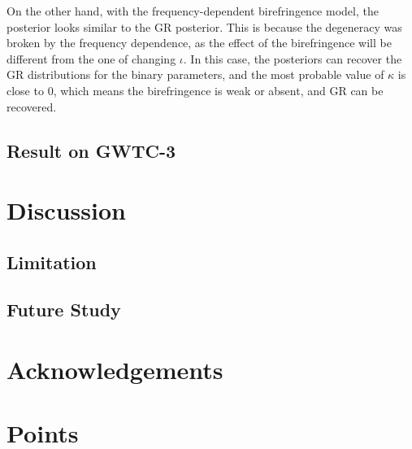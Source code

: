 \documentclass[twocolumn]{aastex631}
\begin{document}
On the other hand, with the frequency-dependent birefringence model, the posterior looks similar to the GR posterior.
This is because the degeneracy was broken by the frequency dependence, as the effect of the birefringence will be different from the one of changing $\iota$.
In this case, the posteriors can recover the GR distributions for the binary parameters,
and the most probable value of $\kappa$ is close to $0$, which means the birefringence is weak or absent, and GR can be recovered.

\subsection{Result on GWTC-3}

\section{Discussion}

\subsection{Limitation}



\subsection{Future Study}



\section{Acknowledgements}





\section{Points}
\end{document}
